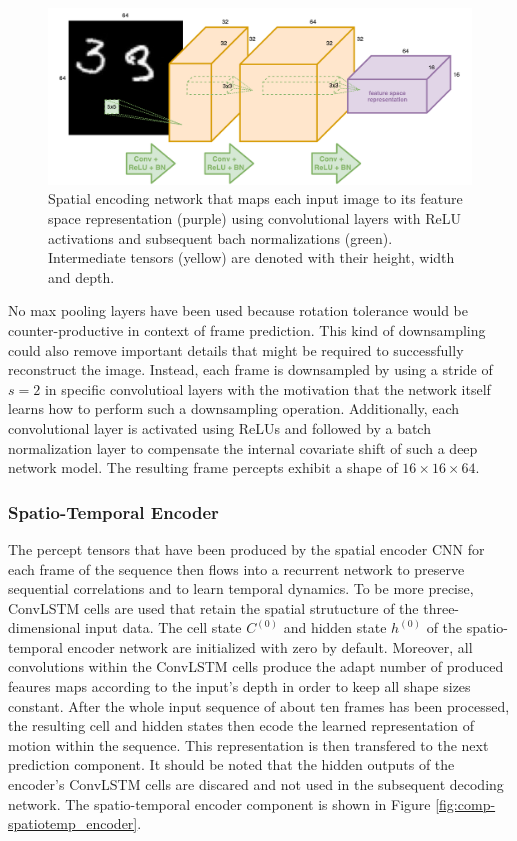 \begin{figure}[htb]
	\centering
	\includegraphics[width=0.8\linewidth]{figures/comp_spatial_encoder.pdf} 
	\caption[Spatial Encoder Component]{Spatial encoding network that maps each input image to its feature space representation (purple) using convolutional layers with ReLU activations and subsequent bach normalizations (green). Intermediate tensors (yellow) are denoted with their height, width and depth.} \label{fig:comp-spatial_encoder}
\end{figure}

No max pooling layers have been used because rotation tolerance would be counter-productive in context of frame prediction. This kind of downsampling could also remove important details that might be required to successfully reconstruct the image. Instead, each frame is downsampled by using a stride of $ s=2 $ in specific convolutioal layers with the motivation that the network itself learns how to perform such a downsampling operation. Additionally, each convolutional layer is activated using ReLUs and followed by a batch normalization layer to compensate the internal covariate shift of such a deep network model. The resulting frame percepts exhibit a shape of $16\times16\times64$.

\subsubsection{Spatio-Temporal Encoder}

The percept tensors that have been produced by the spatial encoder CNN for each frame of the sequence then flows into a recurrent network to preserve sequential correlations and to learn temporal dynamics. To be more precise, ConvLSTM cells are used that retain the spatial strutucture of the three-dimensional input data. The cell state $C^{(0)}$ and hidden state $h^{(0)}$ of the spatio-temporal encoder network are initialized with zero by default. Moreover, all convolutions within the ConvLSTM cells produce the adapt number of produced feaures maps according to the input's depth in order to keep all shape sizes constant. After the whole input sequence of about ten frames has been processed, the resulting cell and hidden states then ecode the learned representation of motion within the sequence. This representation is then transfered to the next prediction component. It should be noted that the hidden outputs of the encoder's ConvLSTM cells are discared and not used in the subsequent decoding network. The spatio-temporal encoder component is shown in Figure \ref{fig:comp-spatiotemp_encoder}.

